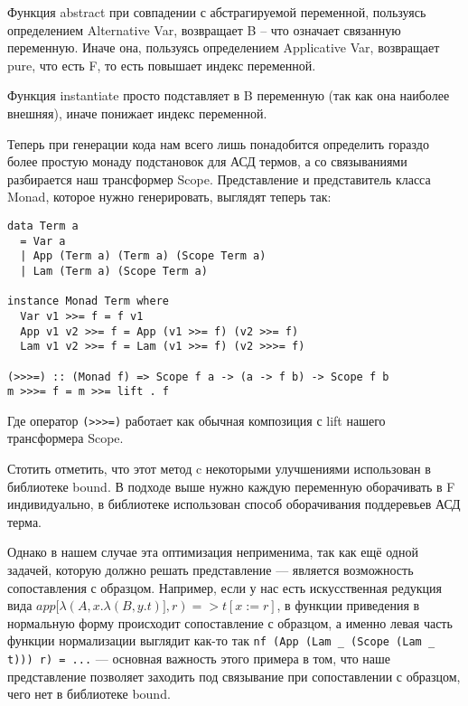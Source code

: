 Функция abstract при совпадении с абстрагируемой переменной, пользуясь определением Alternative Var, возвращает B -- что означает связанную переменную. Иначе она, пользуясь определением Applicative Var, возвращает pure, что есть F, то есть повышает индекс переменной.

Функция instantiate просто подставляет в B переменную (так как она наиболее внешняя), иначе понижает индекс переменной.

Теперь при генерации кода нам всего лишь понадобится определить гораздо более простую монаду подстановок для АСД термов, а со связываниями разбирается наш трансформер Scope. Представление и представитель класса Monad, которое нужно генерировать, выглядят теперь так:

\begin{lstlisting}[frame=single]
data Term a
  = Var a
  | App (Term a) (Term a) (Scope Term a)
  | Lam (Term a) (Scope Term a)

instance Monad Term where
  Var v1 >>= f = f v1
  App v1 v2 >>= f = App (v1 >>= f) (v2 >>= f)
  Lam v1 v2 >>= f = Lam (v1 >>= f) (v2 >>>= f)

(>>>=) :: (Monad f) => Scope f a -> (a -> f b) -> Scope f b
m >>>= f = m >>= lift . f
\end{lstlisting}

Где оператор \lstinline{(>>>=)} работает как обычная композиция с lift нашего трансформера Scope.

Стотить отметить, что этот метод c некоторыми улучшениями использован в библиотеке bound\cite{bound}. В подходе выше нужно каждую переменную оборачивать в F индивидуально, в библиотеке использован способ оборачивания поддеревьев АСД терма.

Однако в нашем случае эта оптимизация неприменима, так как ещё одной задачей, которую должно решать представление --- является возможность сопоставления с образцом. Например, если у нас есть искусственная редукция вида $app[\lambda(A, x.\lambda(B, y.t)], r) => t[x:=r]$, в функции приведения в нормальную форму происходит сопоставление с образцом, а именно левая часть функции нормализации выглядит как-то так \lstinline{nf (App (Lam _ (Scope (Lam _ t))) r) = ...} --- основная важность этого примера в том, что наше представление позволяет заходить под связывание при сопоставлении с образцом, чего нет в библиотеке bound.
